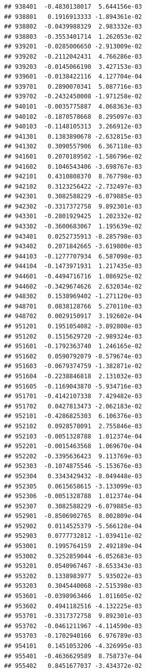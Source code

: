 \begin{frame}[fragile]
\begin{verbatim}
## 938401  -0.4830138017  5.644156e-03
## 938801   0.1916913333 -1.894361e-02
## 938802  -0.0439988329  2.983332e-03
## 938803  -0.3553401714  1.262053e-02
## 939201  -0.0285006650 -2.913009e-02
## 939202  -0.2112042431  4.766286e-03
## 939203  -0.0145066190  3.427153e-03
## 939601  -0.0138422116  4.127704e-04
## 939701   0.2890070341  5.087716e-03
## 939702  -0.2432450008 -1.971258e-02
## 940101  -0.0035775887  4.068363e-03
## 940102  -0.1870578668  8.295097e-03
## 940103  -0.1148105313  3.266912e-03
## 941301   0.1383890678 -2.632815e-03
## 941302   0.3090557906  6.367118e-03
## 941601   0.2070189502 -1.586796e-02
## 941602   0.1046543406 -3.698767e-03
## 942101   0.4310808370  8.767798e-03
## 942102   0.3123256422 -2.732497e-03
## 942301   0.3082588229 -6.079885e-03
## 942302  -0.3317372758  9.892301e-03
## 943301  -0.2801929425  1.202332e-02
## 943302  -0.3600683067  1.195639e-02
## 943401   0.0252735913 -8.285798e-03
## 943402   0.2071842665 -3.619800e-03
## 944103  -0.1277707934  6.587098e-03
## 944104  -0.1473971931  1.217435e-03
## 944601  -0.4494716716  1.086925e-02
## 944602  -0.3429674626  2.632034e-02
## 948302   0.1538969402 -1.271120e-03
## 948701   0.0838128766  5.270110e-03
## 948702   0.0029150917  3.192602e-04
## 951201   0.1951054082 -3.892808e-03
## 951202   0.1515629720 -2.989324e-03
## 951601  -0.1792363740  1.246165e-02
## 951602   0.0590792079 -8.579674e-03
## 951603  -0.0679374759 -1.382871e-02
## 951604  -0.2238846818  2.131032e-03
## 951605  -0.1169043870 -5.934716e-03
## 951701  -0.4142107338  7.429482e-03
## 951702   0.0427813473 -2.062183e-02
## 952101  -0.4286825303  6.106376e-03
## 952102   0.0928578091  2.755846e-03
## 952103  -0.0051328788  1.012374e-04
## 952201  -0.0015463568  1.069670e-04
## 952202  -0.3395636423  9.113769e-03
## 952303  -0.1074875546 -5.153676e-03
## 952304   0.3343429432 -8.049448e-03
## 952305   0.0615658615 -3.133099e-03
## 952306  -0.0051328788  1.012374e-04
## 952307   0.3082588229 -6.079885e-03
## 952901  -0.8506902765  8.002809e-04
## 952902   0.0114525379 -5.566128e-04
## 952903   0.0777732812 -1.039411e-02
## 953001   0.1995764159  2.492189e-04
## 953002   0.3252859044 -6.052683e-03
## 953201   0.0540967467 -8.653343e-03
## 953202   0.1338983977  5.935022e-03
## 953203   0.3045440068 -2.515398e-03
## 953601  -0.0398963466  1.011605e-02
## 953602   0.4941182516 -4.132225e-03
## 953701  -0.3317372758  9.892301e-03
## 953702  -0.0461211967 -4.114590e-03
## 953703  -0.1702940166  6.976789e-03
## 954101   0.1451053206 -4.326995e-03
## 955401  -0.4636629589  8.758737e-04
## 955402   0.8451677037 -3.434372e-02

\end{verbatim}
\end{frame}
